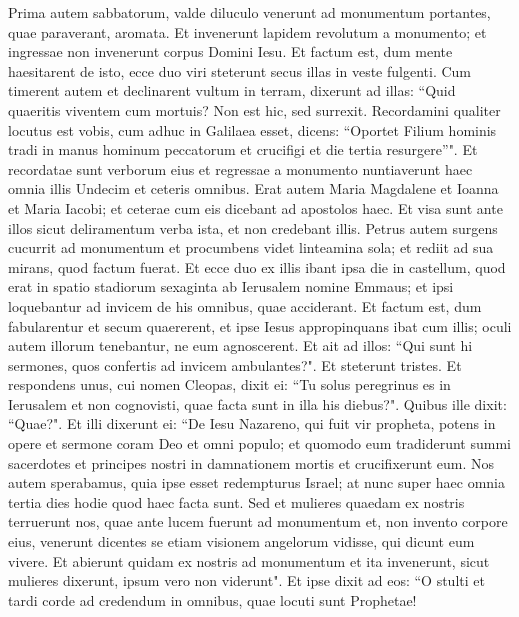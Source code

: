 \begin{biblechapter}  
\verse Prima autem sabbatorum, valde diluculo venerunt ad monumentum portantes, quae paraverant, aromata. 
\verse Et invenerunt lapidem revolutum a monumento;  
\verse et ingressae non invenerunt corpus Domini Iesu. 
\verse Et factum est, dum mente haesitarent de isto, ecce duo viri steterunt secus illas in veste fulgenti.  
\verse Cum timerent autem et declinarent vultum in terram, dixerunt ad illas: “Quid quaeritis viventem cum mortuis? 
\verse Non est hic, sed surrexit. Recordamini qualiter locutus est vobis, cum adhuc in Galilaea esset, 
\verse dicens: “Oportet Filium hominis tradi in manus hominum peccatorum et crucifigi et die tertia resurgere”". 
\verse Et recordatae sunt verborum eius 
\verse et regressae a monumento nuntiaverunt haec omnia illis Undecim et ceteris omnibus. 
\verse Erat autem Maria Magdalene et Ioanna et Maria Iacobi; et ceterae cum eis dicebant ad apostolos haec. 
\verse Et visa sunt ante illos sicut deliramentum verba ista, et non credebant illis. 
\verse Petrus autem surgens cucurrit ad monumentum et procumbens videt linteamina sola; et rediit ad sua mirans, quod factum fuerat. 
\verse Et ecce duo ex illis ibant ipsa die in castellum, quod erat in spatio stadiorum sexaginta ab Ierusalem nomine Emmaus; 
\verse et ipsi loquebantur ad invicem de his omnibus, quae acciderant. 
\verse Et factum est, dum fabularentur et secum quaererent, et ipse Iesus appropinquans ibat cum illis; 
\verse oculi autem illorum tenebantur, ne eum agnoscerent. 
\verse Et ait ad illos: “Qui sunt hi sermones, quos confertis ad invicem ambulantes?". Et steterunt tristes.  
\verse Et respondens unus, cui nomen Cleopas, dixit ei: “Tu solus peregrinus es in Ierusalem et non cognovisti, quae facta sunt in illa his diebus?". 
\verse Quibus ille dixit: “Quae?". Et illi dixerunt ei: “De Iesu Nazareno, qui fuit vir propheta, potens in opere et sermone coram Deo et omni populo; 
\verse et quomodo eum tradiderunt summi sacerdotes et principes nostri in damnationem mortis et crucifixerunt eum. 
\verse Nos autem sperabamus, quia ipse esset redempturus Israel; at nunc super haec omnia tertia dies hodie quod haec facta sunt. 
\verse Sed et mulieres quaedam ex nostris terruerunt nos, quae ante lucem fuerunt ad monumentum 
\verse et, non invento corpore eius, venerunt dicentes se etiam visionem angelorum vidisse, qui dicunt eum vivere. 
\verse Et abierunt quidam ex nostris ad monumentum et ita invenerunt, sicut mulieres dixerunt, ipsum vero non viderunt". 
\verse Et ipse dixit ad eos: “O stulti et tardi corde ad credendum in omnibus, quae locuti sunt Prophetae! 

\end{biblechapter}
